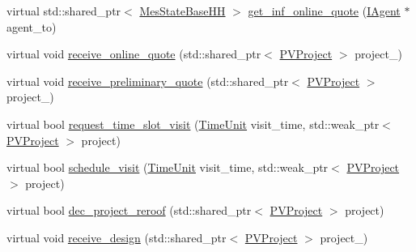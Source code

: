 {\bf }\par
\begin{DoxyCompactItemize}
\item 
virtual std\+::shared\+\_\+ptr$<$ \hyperlink{classsolar__core_1_1_mes_state_base_h_h}{Mes\+State\+Base\+H\+H} $>$ \hyperlink{classsolar__core_1_1_household_a008a18ff8c2d15da72e19876dc896a4e}{get\+\_\+inf\+\_\+online\+\_\+quote} (\hyperlink{classsolar__core_1_1_i_agent}{I\+Agent} $\ast$agent\+\_\+to)
\item 
virtual void \hyperlink{classsolar__core_1_1_household_a306aed410a39e8062ab5f1b4a3216b8b}{receive\+\_\+online\+\_\+quote} (std\+::shared\+\_\+ptr$<$ \hyperlink{classsolar__core_1_1_p_v_project}{P\+V\+Project} $>$ project\+\_\+)
\item 
virtual void \hyperlink{classsolar__core_1_1_household_a31a1c8d006fb9e95a2460aa392eaa830}{receive\+\_\+preliminary\+\_\+quote} (std\+::shared\+\_\+ptr$<$ \hyperlink{classsolar__core_1_1_p_v_project}{P\+V\+Project} $>$ project\+\_\+)
\item 
virtual bool \hyperlink{classsolar__core_1_1_household_a8c9635bac11c9bd93e65dbb5be5b9d85}{request\+\_\+time\+\_\+slot\+\_\+visit} (\hyperlink{namespacesolar__core_a4b5949d07259da6f8a20d12a30403e90}{Time\+Unit} visit\+\_\+time, std\+::weak\+\_\+ptr$<$ \hyperlink{classsolar__core_1_1_p_v_project}{P\+V\+Project} $>$ project)
\item 
virtual bool \hyperlink{classsolar__core_1_1_household_a8d4b9c4a5cf59c93f33489eccbfba7db}{schedule\+\_\+visit} (\hyperlink{namespacesolar__core_a4b5949d07259da6f8a20d12a30403e90}{Time\+Unit} visit\+\_\+time, std\+::weak\+\_\+ptr$<$ \hyperlink{classsolar__core_1_1_p_v_project}{P\+V\+Project} $>$ project)
\item 
virtual bool \hyperlink{classsolar__core_1_1_household_aa63241ca3fcc1f2374d10b5c7f44124a}{dec\+\_\+project\+\_\+reroof} (std\+::shared\+\_\+ptr$<$ \hyperlink{classsolar__core_1_1_p_v_project}{P\+V\+Project} $>$ project)
\end{DoxyCompactItemize}

{\bf }\par
\begin{DoxyCompactItemize}
\item 
virtual void \hyperlink{classsolar__core_1_1_household_a7df346780d3d9683293af565d5831d05}{receive\+\_\+design} (std\+::shared\+\_\+ptr$<$ \hyperlink{classsolar__core_1_1_p_v_project}{P\+V\+Project} $>$ project\+\_\+)
\end{DoxyCompactItemize}

